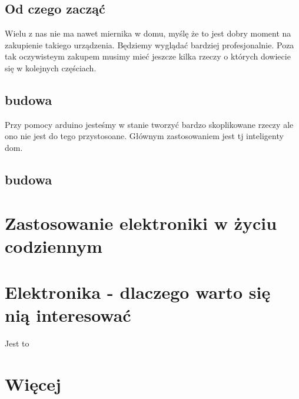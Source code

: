 		\subsection {Od czego zacząć}
			Wielu z nas nie ma nawet miernika w domu, myślę że to jest dobry moment na zakupienie takiego urządzenia. Będziemy wyglądać bardziej profesjonalnie. Poza tak oczywisteym zakupem musimy mieć jeszcze kilka rzeczy o których dowiecie się w kolejnych częściach.
	\subsection{budowa}
	Przy pomocy arduino jesteśmy w stanie tworzyć bardzo skoplikowane rzeczy ale ono nie jest do tego przystosoane. Głównym zastosowaniem jest tj inteligenty dom.
	\subsection{budowa}

\section {Zastosowanie elektroniki w życiu codziennym }
\section{Elektronika - dlaczego warto się nią interesować}
Jest to 
\section {Więcej}
~\\
%
\newpage





